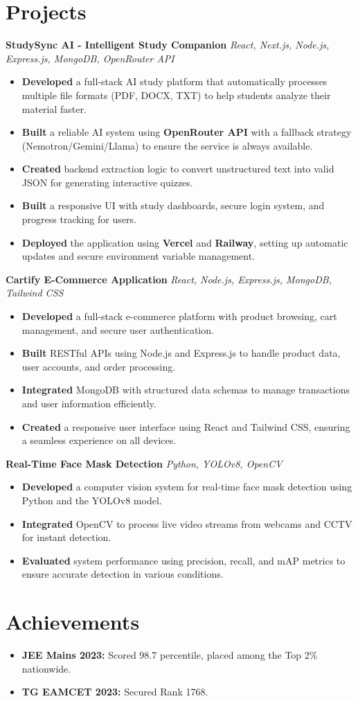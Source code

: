 \documentclass[letterpaper,10pt]{article}
\newcommand{\resumeItem}[1]{\item\small{{#1 \vspace{-2pt}}}}
\newcommand{\resumeSubItem}[1]{\resumeItem{#1}\vspace{-3pt}}
\newcommand{\resumeSubHeadingListStart}{\begin{itemize}[leftmargin=0.15in, label={}]}
\newcommand{\resumeSubHeadingListEnd}{\end{itemize}}
\begin{document}
\section*{Projects}

\textbf{StudySync AI - Intelligent Study Companion} \hfill \textit{React, Next.js, Node.js, Express.js, MongoDB, OpenRouter API}
\begin{itemize}
  \item \textbf{Developed} a full-stack AI study platform that automatically processes multiple file formats (PDF, DOCX, TXT) to help students analyze their material faster.
  \item \textbf{Built} a reliable AI system using \textbf{OpenRouter API} with a fallback strategy (Nemotron/Gemini/Llama) to ensure the service is always available.
  \item \textbf{Created} backend extraction logic to convert unstructured text into valid JSON for generating interactive quizzes.
  \item \textbf{Built} a responsive UI with study dashboards, secure login system, and progress tracking for users.
  \item \textbf{Deployed} the application using \textbf{Vercel} and \textbf{Railway}, setting up automatic updates and secure environment variable management.
\end{itemize}

\textbf{ Cartify E-Commerce Application } \hfill \textit{React, Node.js, Express.js, MongoDB, Tailwind CSS}
\begin{itemize}
  \item \textbf{Developed} a full-stack e-commerce platform with product browsing, cart management, and secure user authentication.
  \item \textbf{Built} RESTful APIs using Node.js and Express.js to handle product data, user accounts, and order processing.
  \item \textbf{Integrated} MongoDB with structured data schemas to manage transactions and user information efficiently.
  \item \textbf{Created} a responsive user interface using React and Tailwind CSS, ensuring a seamless experience on all devices.
\end{itemize}

\textbf{Real-Time Face Mask Detection} \hfill \textit{Python, YOLOv8, OpenCV}
\begin{itemize}
  \item \textbf{Developed} a computer vision system for real-time face mask detection using Python and the YOLOv8 model.
  \item \textbf{Integrated} OpenCV to process live video streams from webcams and CCTV for instant detection.
  \item \textbf{Evaluated} system performance using precision, recall, and mAP metrics to ensure accurate detection in various conditions.
\end{itemize}


\section{Achievements}
\resumeSubHeadingListStart
  \resumeSubItem{\textbf{JEE Mains 2023:} Scored 98.7 percentile, placed among the Top 2\% nationwide.}
  \resumeSubItem{\textbf{TG EAMCET 2023:} Secured Rank 1768.}
\resumeSubHeadingListEnd
\end{document}
